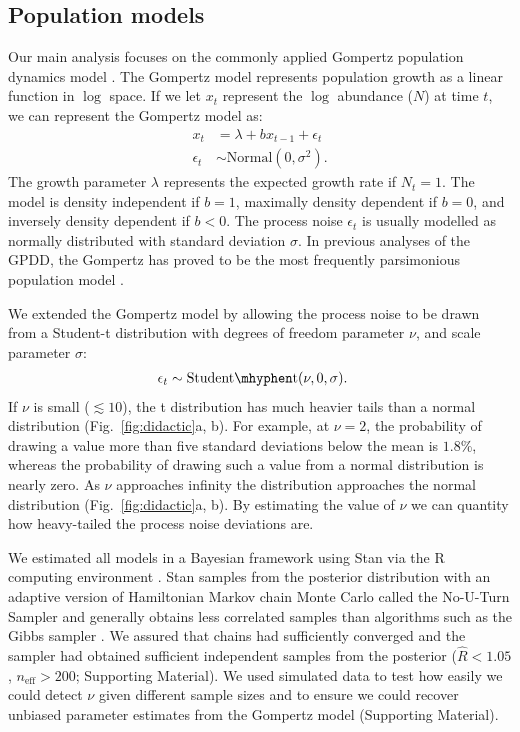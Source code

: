 \subsection{Population models}

Our main analysis focuses on the commonly applied Gompertz population dynamics
model \citep[e.g.][]{knape2012,dennis2014,connors2014}. The Gompertz model
represents population growth as a linear function in $\log$ space. If we let
$x_t$ represent the $\log$ abundance ($N$) at time $t$, we can represent the
Gompertz model as:
\begin{align*}
x_t &= \lambda + b x_{t-1} + \epsilon_t\\
\epsilon_t &\sim \mathrm{Normal}(0, \sigma^2).
\end{align*}
The growth parameter $\lambda$ represents the expected growth rate if $N_t
= 1$. The model is density independent if $b = 1$, maximally density dependent
if $b = 0$, and inversely density dependent if $b < 0$. The process noise
$\epsilon_t$ is usually modelled as normally distributed with standard
deviation $\sigma$. In previous analyses of the GPDD, the Gompertz has proved
to be the most frequently parsimonious population model \citep{brook2006}.

We extended the Gompertz model by allowing the process noise to be
drawn from a Student-t distribution with degrees of freedom parameter $\nu$,
and scale parameter $\sigma$:
\begin{align*}
\epsilon_t &\sim \mathrm{Student\mhyphen t}(\nu, 0, \sigma).
\end{align*}
If $\nu$ is small ($\lesssim 10$), the t distribution has much heavier tails
than a normal distribution (Fig.~\ref{fig:didactic}a, b). For example, at $\nu
= 2$, the probability of drawing a value more than five standard deviations
below the mean is $1.8$\%, whereas the probability of drawing such a value from
a normal distribution is nearly zero. As $\nu$ approaches infinity the
distribution approaches the normal distribution (Fig.~\ref{fig:didactic}a, b).
By estimating the value of $\nu$ we can quantity how heavy-tailed the process
noise deviations are.


We estimated all models in a Bayesian framework using Stan \citep[][version
2.4.0]{stan-manual2014} via the R computing environment \citep{r2014}. Stan
samples from the posterior distribution with an adaptive version of Hamiltonian
Markov chain Monte Carlo called the No-U-Turn Sampler and generally obtains
less correlated samples than algorithms such as the Gibbs sampler
\citep{hoffman2014}. We assured that chains had sufficiently converged and the
sampler had obtained sufficient independent samples from the posterior
($\widehat{R} < 1.05$, $n_\mathrm{eff} > 200$; Supporting Material). We used
simulated data to test how easily we could detect $\nu$ given different sample
sizes and to ensure we could recover unbiased parameter estimates from the
Gompertz model (Supporting Material).

